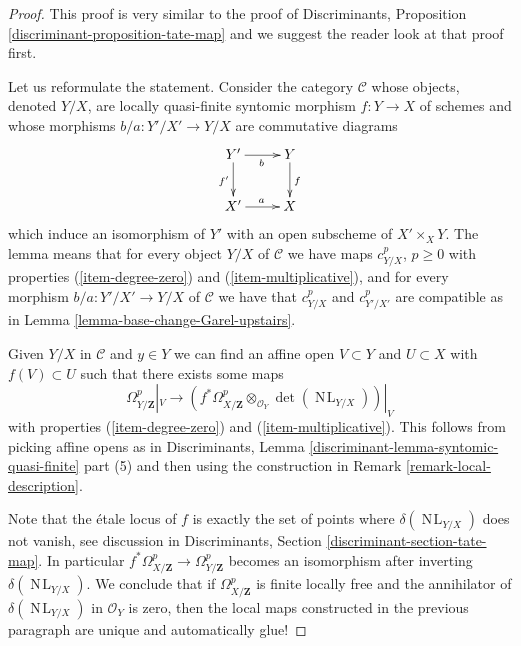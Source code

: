 \documentclass[10pt,a4paper]{amsart}
\theoremstyle{plain}
\theoremstyle{definition}
\theoremstyle{remark}
\numberwithin{equation}{subsection}
\def\NL{\mathop{N\!L}\nolimits}
\begin{document}
\begin{proof}
This proof is very similar to the proof of
Discriminants, Proposition \ref{discriminant-proposition-tate-map}
and we suggest the reader look at that proof first.

\medskip\noindent
Let us reformulate the statement. Consider the category
$\mathcal{C}$ whose objects, denoted $Y/X$, are locally quasi-finite syntomic
morphism $f : Y \to X$ of schemes and whose morphisms
$b/a : Y'/X' \to Y/X$ are commutative diagrams
$$
\xymatrix{
Y' \ar[d]_{f'} \ar[r]_b & Y \ar[d]^f \\
X' \ar[r]^a & X
}
$$
which induce an isomorphism of $Y'$ with an open subscheme of
$X' \times_X Y$. The lemma means that for every object
$Y/X$ of $\mathcal{C}$ we have maps $c^p_{Y/X}$, $p \geq 0$
with properties (\ref{item-degree-zero}) and (\ref{item-multiplicative}),
and for every morphism $b/a : Y'/X' \to Y/X$ of $\mathcal{C}$ we have
that $c^p_{Y/X}$ and $c^p_{Y'/X'}$ are compatible as in
Lemma \ref{lemma-base-change-Garel-upstairs}.

\medskip\noindent
Given $Y/X$ in $\mathcal{C}$ and $y \in Y$ we can find
an affine open $V \subset Y$ and $U \subset X$ with $f(V) \subset U$
such that there exists some maps
$$
\Omega^p_{Y/\mathbf{Z}}|_V
\longrightarrow
\left(
f^*\Omega^p_{X/\mathbf{Z}} \otimes_{\mathcal{O}_Y} \det(\NL_{Y/X})
\right)|_V
$$
with properties (\ref{item-degree-zero}) and (\ref{item-multiplicative}).
This follows from picking affine opens as in
Discriminants, Lemma \ref{discriminant-lemma-syntomic-quasi-finite} part (5)
and then using the construction in Remark \ref{remark-local-description}.

\medskip\noindent
Note that the \'etale locus of $f$ is exactly the set of points where
$\delta(\NL_{Y/X})$ does not vanish, see discussion in
Discriminants, Section \ref{discriminant-section-tate-map}.
In particular
$f^*\Omega^p_{X/\mathbf{Z}} \to \Omega^p_{Y/\mathbf{Z}}$
becomes an isomorphism after inverting $\delta(\NL_{Y/X})$.
We conclude that if $\Omega^p_{X/\mathbf{Z}}$ is finite locally free and
the annihilator of $\delta(\NL_{Y/X})$ in $\mathcal{O}_Y$ is zero, then
the local maps constructed in the previous paragraph
are unique and automatically glue!


\end{proof}
\end{document}
